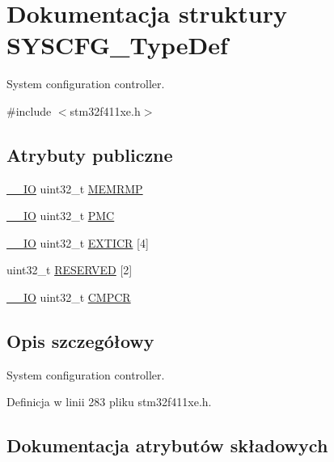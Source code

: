 \hypertarget{struct_s_y_s_c_f_g___type_def}{}\section{Dokumentacja struktury S\+Y\+S\+C\+F\+G\+\_\+\+Type\+Def}
\label{struct_s_y_s_c_f_g___type_def}


System configuration controller.  




{\ttfamily \#include $<$stm32f411xe.\+h$>$}

\subsection*{Atrybuty publiczne}
\begin{DoxyCompactItemize}
\item 
\hyperlink{core__sc300_8h_aec43007d9998a0a0e01faede4133d6be}{\+\_\+\+\_\+\+IO} uint32\+\_\+t \hyperlink{struct_s_y_s_c_f_g___type_def_a85b9d3df2274b730327b181c402a7bf5}{M\+E\+M\+R\+MP}
\item 
\hyperlink{core__sc300_8h_aec43007d9998a0a0e01faede4133d6be}{\+\_\+\+\_\+\+IO} uint32\+\_\+t \hyperlink{struct_s_y_s_c_f_g___type_def_ab5c47c570566cb8ff9d0436c17cc9241}{P\+MC}
\item 
\hyperlink{core__sc300_8h_aec43007d9998a0a0e01faede4133d6be}{\+\_\+\+\_\+\+IO} uint32\+\_\+t \hyperlink{struct_s_y_s_c_f_g___type_def_a66a06b3aab7ff5c8fa342f7c1994bf7d}{E\+X\+T\+I\+CR} \mbox{[}4\mbox{]}
\item 
uint32\+\_\+t \hyperlink{struct_s_y_s_c_f_g___type_def_a43926e6d31a976a0018b2d1f5c92645d}{R\+E\+S\+E\+R\+V\+ED} \mbox{[}2\mbox{]}
\item 
\hyperlink{core__sc300_8h_aec43007d9998a0a0e01faede4133d6be}{\+\_\+\+\_\+\+IO} uint32\+\_\+t \hyperlink{struct_s_y_s_c_f_g___type_def_ada13497abc6402300570ff5f430a612e}{C\+M\+P\+CR}
\end{DoxyCompactItemize}


\subsection{Opis szczegółowy}
System configuration controller. 

Definicja w linii 283 pliku stm32f411xe.\+h.



\subsection{Dokumentacja atrybutów składowych}
\mbox{\label{struct_s_y_s_c_f_g___type_def_ada13497abc6402300570ff5f430a612e}} 

